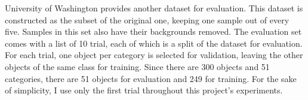 University of Washington provides another dataset for evaluation. This dataset is constructed as the subset of the original one, keeping one sample out of every five. Samples in this set also have their backgrounds removed. The evaluation set comes with a list of 10 trial, each of which is a split of the dataset for evaluation. For each trial, one object per category is selected for validation, leaving the other objects of the same class for training. Since there are 300 objects and 51 categories, there are 51 objects for evaluation and 249 for training. For the sake of simplicity, I use only the first trial throughout this project's experiments.